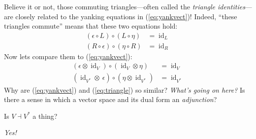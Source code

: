 \documentclass{tufte-handout-tai}
\DeclareMathOperator{\id}{id}
\theoremstyle{plain}
\theoremstyle{definition}
\theoremstyle{remark}
\begin{document}
Believe it or not, those commuting triangles---often called the \textit{triangle identities}---are closely related to the yanking equations in (\ref{eq:yankvect})! Indeed, ``these triangles commute''  means that these two equations hold:
\begin{equation}
\begin{aligned}\label{eq:triangle}
(\epsilon\circ L)\circ(L\circ \eta)&=\id_L\\[7pt]
(R\circ \epsilon)\circ (\eta\circ R)&=\id_R
\end{aligned}
\end{equation}
Now lets compare them to (\ref{eq:yankvect}):
\begin{align*}
(\epsilon \otimes \id_V)\circ (\id_V\otimes \eta)&=\id_V\\[7pt]
(\id_{V^*}\otimes\:\epsilon)\circ (\eta\otimes \id_{V^*})&=\id_{V^*}
\end{align*}
Why are (\ref{eq:yankvect}) and (\ref{eq:triangle}) so similar? \textit{What's going on here?} Is there a sense in which a vector space and its dual form an \textit{adjunction}? 

\vspace{0.2cm}
\noindent Is $V\dashv V^*$ a thing?
\vspace{0.2cm}

\vspace{0.2cm}
\noindent \textit{Yes!}
\vspace{0.4cm} 
\end{document}
